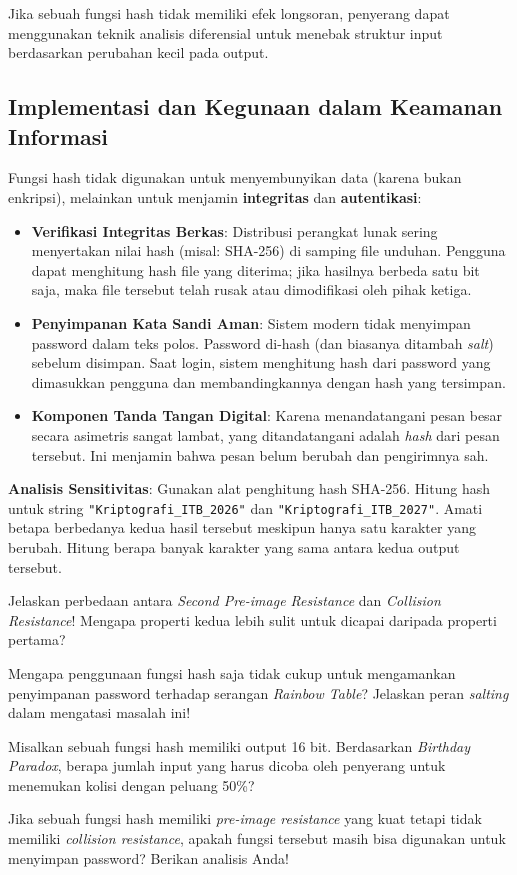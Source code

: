 Jika sebuah fungsi hash tidak memiliki efek longsoran, penyerang dapat menggunakan teknik analisis diferensial untuk menebak struktur input berdasarkan perubahan kecil pada output.

\subsection{Implementasi dan Kegunaan dalam Keamanan Informasi}

Fungsi hash tidak digunakan untuk menyembunyikan data (karena bukan enkripsi), melainkan untuk menjamin \textbf{integritas} dan \textbf{autentikasi}:

\begin{itemize}
    \item \textbf{Verifikasi Integritas Berkas}: Distribusi perangkat lunak sering menyertakan nilai hash (misal: SHA-256) di samping file unduhan. Pengguna dapat menghitung hash file yang diterima; jika hasilnya berbeda satu bit saja, maka file tersebut telah rusak atau dimodifikasi oleh pihak ketiga.
    \item \textbf{Penyimpanan Kata Sandi Aman}: Sistem modern tidak menyimpan password dalam teks polos. Password di-hash (dan biasanya ditambah \textit{salt}) sebelum disimpan. Saat login, sistem menghitung hash dari password yang dimasukkan pengguna dan membandingkannya dengan hash yang tersimpan.
    \item \textbf{Komponen Tanda Tangan Digital}: Karena menandatangani pesan besar secara asimetris sangat lambat, yang ditandatangani adalah \textit{hash} dari pesan tersebut. Ini menjamin bahwa pesan belum berubah dan pengirimnya sah.
\end{itemize}

\begin{aktivitas}
  \item \textbf{Analisis Sensitivitas}: Gunakan alat penghitung hash SHA-256. Hitung hash untuk string \texttt{"Kriptografi\_ITB\_2026"} dan \texttt{"Kriptografi\_ITB\_2027"}. Amati betapa berbedanya kedua hasil tersebut meskipun hanya satu karakter yang berubah. Hitung berapa banyak karakter yang sama antara kedua output tersebut.
\end{aktivitas}

\begin{latihan}
  \item Jelaskan perbedaan antara \textit{Second Pre-image Resistance} dan \textit{Collision Resistance}! Mengapa properti kedua lebih sulit untuk dicapai daripada properti pertama?
  \item Mengapa penggunaan fungsi hash saja tidak cukup untuk mengamankan penyimpanan password terhadap serangan \textit{Rainbow Table}? Jelaskan peran \textit{salting} dalam mengatasi masalah ini!
  \item Misalkan sebuah fungsi hash memiliki output 16 bit. Berdasarkan \textit{Birthday Paradox}, berapa jumlah input yang harus dicoba oleh penyerang untuk menemukan kolisi dengan peluang 50\%?
  \item Jika sebuah fungsi hash memiliki \textit{pre-image resistance} yang kuat tetapi tidak memiliki \textit{collision resistance}, apakah fungsi tersebut masih bisa digunakan untuk menyimpan password? Berikan analisis Anda!
\end{latihan}

